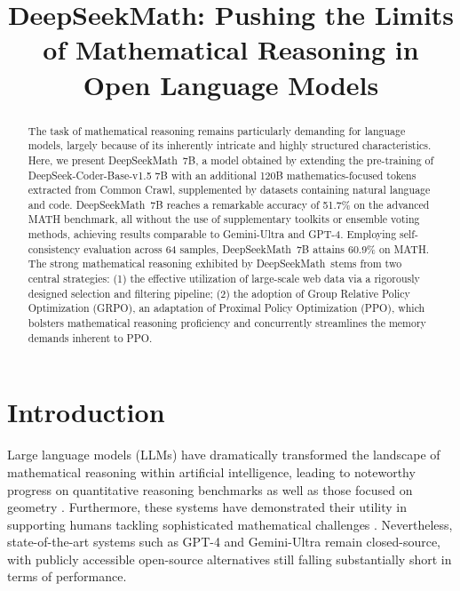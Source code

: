 \title{DeepSeekMath: Pushing the Limits of Mathematical Reasoning in Open Language Models}

\begin{abstract}
The task of mathematical reasoning remains particularly demanding for language models, largely because of its inherently intricate and highly structured characteristics. Here, we present DeepSeekMath~7B, a model obtained by extending the pre-training of DeepSeek-Coder-Base-v1.5 7B with an additional 120B mathematics-focused tokens extracted from Common Crawl, supplemented by datasets containing natural language and code. DeepSeekMath~7B reaches a remarkable accuracy of 51.7\% on the advanced MATH benchmark, all without the use of supplementary toolkits or ensemble voting methods, achieving results comparable to Gemini-Ultra and GPT-4. Employing self-consistency evaluation across 64 samples, DeepSeekMath~7B attains 60.9\% on MATH. The strong mathematical reasoning exhibited by DeepSeekMath~stems from two central strategies: (1) the effective utilization of large-scale web data via a rigorously designed selection and filtering pipeline; (2) the adoption of Group Relative Policy Optimization (GRPO), an adaptation of Proximal Policy Optimization (PPO), which bolsters mathematical reasoning proficiency and concurrently streamlines the memory demands inherent to PPO.
\end{abstract}

\section{Introduction}

Large language models (LLMs) have dramatically transformed the landscape of mathematical reasoning within artificial intelligence, leading to noteworthy progress on quantitative reasoning benchmarks \citep{MATH} as well as those focused on geometry \citep{trinh2024solving}. Furthermore, these systems have demonstrated their utility in supporting humans tackling sophisticated mathematical challenges \citep{tao}. Nevertheless, state-of-the-art systems such as GPT-4 \citep{gpt4} and Gemini-Ultra \citep{gemini} remain closed-source, with publicly accessible open-source alternatives still falling substantially short in terms of performance.


